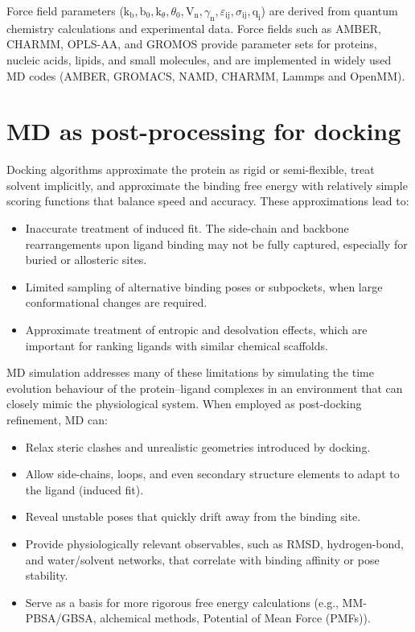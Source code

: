 \documentclass[12pt]{article}
\begin{document}
Force field parameters ($\textrm{k}_\textrm{b}, \textrm{b}_\textrm{0}, \textrm{k}_\theta, \theta_\textrm{0}, \textrm{V}_\textrm{n}, \gamma_\textrm{n}, \varepsilon_\textrm{ij}, \sigma_\textrm{ij}, \textrm{q}_\textrm{i}$) are derived from quantum chemistry calculations and experimental data. Force fields such as AMBER, CHARMM, OPLS-AA, and GROMOS provide parameter sets for proteins, nucleic acids, lipids, and small molecules, and are implemented in widely used MD codes (AMBER, GROMACS, NAMD, CHARMM, Lammps and OpenMM)\cite{CH9_salomon2013overview,CH9_Abraham2015,CH9_Phillips2020}.

\section{MD as post-processing for docking}

Docking algorithms approximate the protein as rigid or semi-flexible, treat solvent implicitly, and approximate the binding free energy with relatively simple scoring functions that balance speed and accuracy\cite{CH9_Kitchen2004,CH9_Pagadala2017}. These approximations lead to:

\begin{itemize}
\item Inaccurate treatment of induced fit. The side-chain and backbone rearrangements upon ligand binding may not be fully captured, especially for buried or allosteric sites.
\item Limited sampling of alternative binding poses or subpockets, when large conformational changes are required.
\item Approximate treatment of entropic and desolvation effects, which are important for ranking ligands with similar chemical scaffolds.
\end{itemize}

MD simulation addresses many of these limitations by simulating the time evolution behaviour of the protein--ligand complexes in an environment that can closely mimic the physiological system. 
When employed as post-docking refinement, MD can:

\begin{itemize}
\item Relax steric clashes and unrealistic geometries introduced by docking.
\item Allow side-chains, loops, and even secondary structure elements to adapt to the ligand (induced fit).
\item Reveal unstable poses that quickly drift away from the binding site.
\item Provide physiologically relevant observables, such as RMSD, hydrogen-bond, and water/solvent networks, that correlate with binding affinity or pose stability.
\item Serve as a basis for more rigorous free energy calculations (e.g., MM-PBSA/GBSA, alchemical methods, Potential of Mean Force (PMFs)).
\end{itemize}
\end{document}
